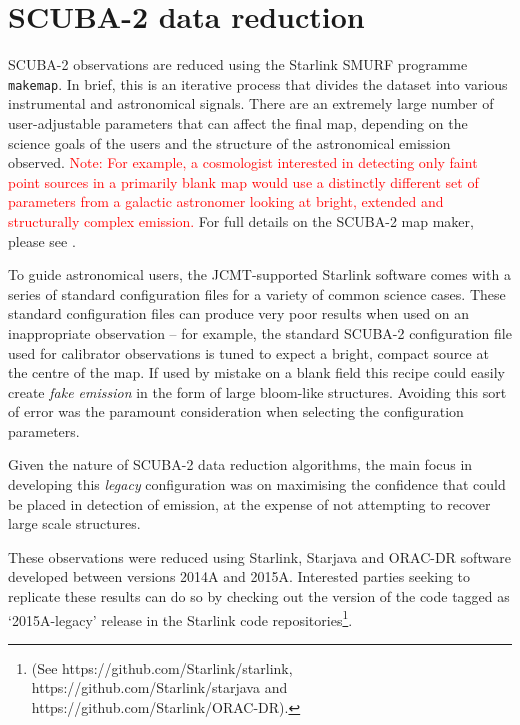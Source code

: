 \documentclass[twocolumn]{aastex6}
\newcommand{\note}[1]{\textcolor{red}{Note: #1}}
\begin{document}
\section{SCUBA-2 data reduction}
\label{sec:dr}
SCUBA-2 observations are reduced using the Starlink SMURF programme
\texttt{makemap}. In brief, this is an iterative process that divides
the dataset into various instrumental and astronomical signals. There
are an extremely large number of user-adjustable parameters that can
affect the final map, depending on the science goals of the users and
the structure of the astronomical emission observed. \note{For example, a
cosmologist interested in detecting only faint point sources in a
primarily blank map would use a distinctly different set of parameters
from a galactic astronomer looking at bright, extended and
structurally complex emission.} For full details on the SCUBA-2 map
maker, please see \citet{Chapin2013}.


To guide astronomical users, the JCMT-supported Starlink software
comes with a series of standard configuration files for a variety of
common science cases.
These standard configuration files can produce very poor results when
used on an inappropriate observation -- for example, the standard
SCUBA-2 configuration file used for calibrator observations is tuned
to expect a bright, compact source at the centre of the map. If used
by mistake on a blank field this recipe could easily create \emph{fake
  emission} in the form of large bloom-like structures. Avoiding this
sort of error was the paramount consideration when selecting the
configuration parameters.

Given the nature of SCUBA-2 data reduction algorithms, the main focus
in developing this \emph{legacy} configuration was on maximising the
confidence that could be placed in detection of emission, at the
expense of not attempting to recover large scale structures.

These observations were reduced using Starlink, Starjava and ORAC-DR
software developed between versions 2014A and 2015A. Interested
parties seeking to replicate these results can do so by checking out
the version of the code tagged as `2015A-legacy' release in the
Starlink code repositories\footnote{(See
  https://github.com/Starlink/starlink,
  https://github.com/Starlink/starjava and
  https://github.com/Starlink/ORAC-DR).}.
\end{document}

